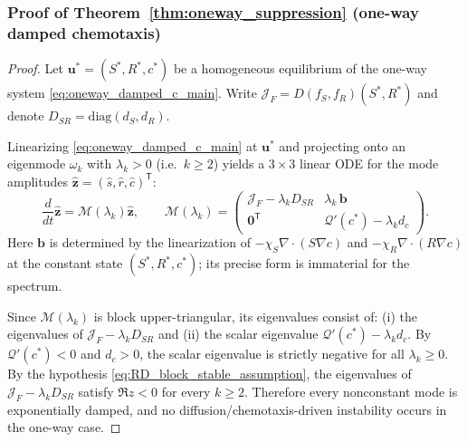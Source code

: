 \documentclass[pdflatex,sn-mathphys-ay]{sn-jnl}
\theoremstyle{thmstyleone}
\theoremstyle{definition}
\theoremstyle{remark}
\begin{document}
\subsubsection*{Proof of Theorem~\ref{thm:oneway_suppression} (one-way damped chemotaxis)}
\begin{proof}
Let $\mathbf{u}^*=(S^*,R^*,c^*)$ be a homogeneous equilibrium of the one-way system \eqref{eq:oneway_damped_c_main}.
Write $\mathcal{J}_F=D(f_S,f_R)(S^*,R^*)$ and denote $D_{SR}=\mathrm{diag}(d_S,d_R)$.

Linearizing \eqref{eq:oneway_damped_c_main} at $\mathbf{u}^*$ and projecting onto an eigenmode $\omega_k$ with $\lambda_k>0$
(i.e.\ $k\ge2$) yields a $3\times3$ linear ODE for the mode amplitudes
$\hat{\mathbf{z}}=(\hat s,\hat r,\hat c)^{\mathsf T}$:
\begin{equation}
\label{eq:analysis_oneway_mode}
\frac{d}{dt}\hat{\mathbf{z}}=\mathcal{M}(\lambda_k)\hat{\mathbf{z}},
\qquad
\mathcal{M}(\lambda_k)=
\begin{pmatrix}
\mathcal{J}_F-\lambda_k D_{SR} & \lambda_k\,\mathbf{b}\\[2pt]
\mathbf{0}^{\mathsf T} & \mathcal{Q}'(c^*)-\lambda_k d_c
\end{pmatrix}.
\end{equation}
Here $\mathbf{b}$ is determined by the linearization of $-\chi_S\nabla\cdot(S\nabla c)$ and $-\chi_R\nabla\cdot(R\nabla c)$
at the constant state $(S^*,R^*,c^*)$; its precise form is immaterial for the spectrum.

Since $\mathcal{M}(\lambda_k)$ is block upper-triangular, its eigenvalues consist of:
(i) the eigenvalues of $\mathcal{J}_F-\lambda_k D_{SR}$ and
(ii) the scalar eigenvalue $\mathcal{Q}'(c^*)-\lambda_k d_c$.
By $\mathcal{Q}'(c^*)<0$ and $d_c>0$, the scalar eigenvalue is strictly negative for all $\lambda_k\ge0$.
By the hypothesis \eqref{eq:RD_block_stable_assumption}, the eigenvalues of $\mathcal{J}_F-\lambda_k D_{SR}$ satisfy
$\Re z<0$ for every $k\ge2$.
Therefore every nonconstant mode is exponentially damped, and no diffusion/chemotaxis-driven instability occurs in the one-way case.
\end{proof}
\end{document}
